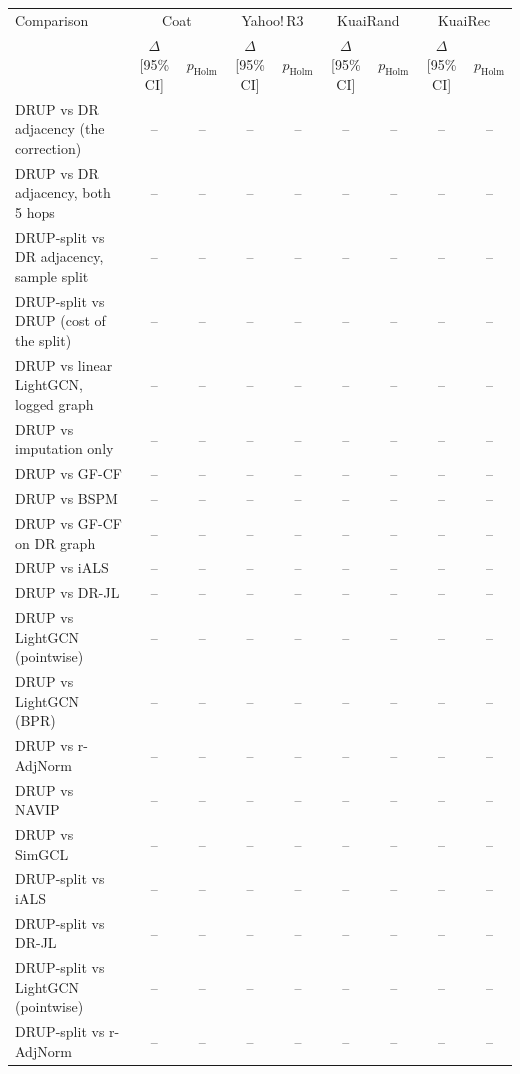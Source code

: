\begin{tabular}{lcccccccc}
\toprule
Comparison & \multicolumn{2}{c}{Coat} & \multicolumn{2}{c}{Yahoo!\,R3} & \multicolumn{2}{c}{KuaiRand} & \multicolumn{2}{c}{KuaiRec}\\
 & $\Delta$ [95\% CI] & $p_{\mathrm{Holm}}$ & $\Delta$ [95\% CI] & $p_{\mathrm{Holm}}$ & $\Delta$ [95\% CI] & $p_{\mathrm{Holm}}$ & $\Delta$ [95\% CI] & $p_{\mathrm{Holm}}$\\
\midrule
DRUP vs DR adjacency (the correction) & -- & -- & -- & -- & -- & -- & -- & --\\
DRUP vs DR adjacency, both 5 hops & -- & -- & -- & -- & -- & -- & -- & --\\
DRUP-split vs DR adjacency, sample split & -- & -- & -- & -- & -- & -- & -- & --\\
DRUP-split vs DRUP (cost of the split) & -- & -- & -- & -- & -- & -- & -- & --\\
DRUP vs linear LightGCN, logged graph & -- & -- & -- & -- & -- & -- & -- & --\\
DRUP vs imputation only & -- & -- & -- & -- & -- & -- & -- & --\\
DRUP vs GF-CF & -- & -- & -- & -- & -- & -- & -- & --\\
DRUP vs BSPM & -- & -- & -- & -- & -- & -- & -- & --\\
DRUP vs GF-CF on DR graph & -- & -- & -- & -- & -- & -- & -- & --\\
DRUP vs iALS & -- & -- & -- & -- & -- & -- & -- & --\\
DRUP vs DR-JL & -- & -- & -- & -- & -- & -- & -- & --\\
DRUP vs LightGCN (pointwise) & -- & -- & -- & -- & -- & -- & -- & --\\
DRUP vs LightGCN (BPR) & -- & -- & -- & -- & -- & -- & -- & --\\
DRUP vs r-AdjNorm & -- & -- & -- & -- & -- & -- & -- & --\\
DRUP vs NAVIP & -- & -- & -- & -- & -- & -- & -- & --\\
DRUP vs SimGCL & -- & -- & -- & -- & -- & -- & -- & --\\
DRUP-split vs iALS & -- & -- & -- & -- & -- & -- & -- & --\\
DRUP-split vs DR-JL & -- & -- & -- & -- & -- & -- & -- & --\\
DRUP-split vs LightGCN (pointwise) & -- & -- & -- & -- & -- & -- & -- & --\\
DRUP-split vs r-AdjNorm & -- & -- & -- & -- & -- & -- & -- & --\\
\bottomrule
\end{tabular}
